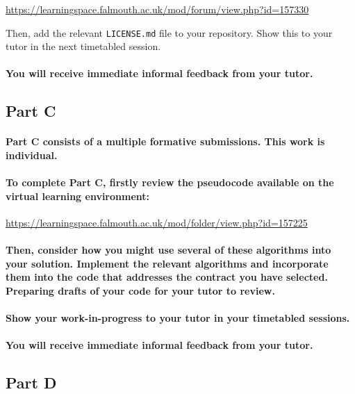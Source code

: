\documentclass{../../fal_assignment}
\begin{document}
\url{https://learningspace.falmouth.ac.uk/mod/forum/view.php?id=157330}

Then, add the relevant \texttt{LICENSE.md} file to your repository. Show this to your tutor in the next timetabled session. 

\paragraph{You will receive immediate \textbf{informal feedback} from your \textbf{tutor}.}

\subsection*{Part C}

\paragraph{Part C consists of a \textbf{multiple formative submissions}. This work is \textbf{individual}.}

\paragraph{To complete Part C, firstly review the pseudocode available on the virtual learning environment:}

\url{https://learningspace.falmouth.ac.uk/mod/folder/view.php?id=157225}

\paragraph{Then, consider how you might use several of these algorithms into your solution. Implement the relevant algorithms and incorporate them into the code that addresses the contract you have selected. Preparing drafts of your code for your tutor to review.}

\paragraph{Show your work-in-progress to your tutor in your timetabled sessions.}

\paragraph{You will receive immediate \textbf{informal feedback} from your \textbf{tutor}.}

\subsection*{Part D}
\end{document}
